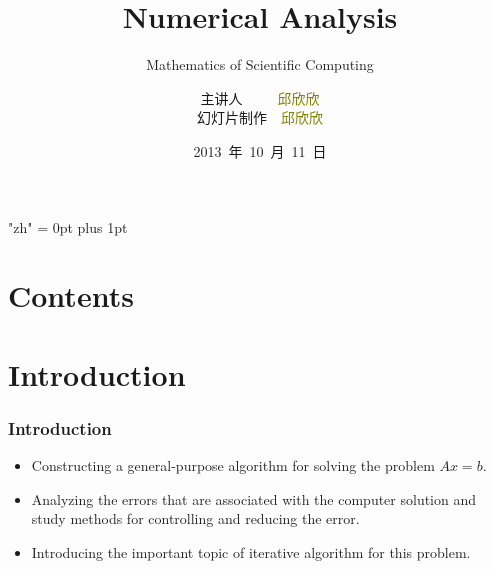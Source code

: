\documentclass[notheorems,mathserif,table,compress]{beamer}  %
\begin{document}
\XeTeXlinebreaklocale "zh"         %
\XeTeXlinebreakskip = 0pt plus 1pt %


\title[Numerical Analysis]{Numerical Analysis}
\subtitle{Mathematics of Scientific Computing}
\author[qiu]{主讲人~~~~~\textcolor{olive}{邱欣欣}\\
    \quad 幻灯片制作~~\textcolor{olive}{邱欣欣}}
\institute[中国海洋大学]{\small\textcolor{violet}{中国海洋大学~~信息科学与工程学院}}
\date{2013~年~10~月~11~日}
\frame{ \titlepage }
\section*{Contents}
\section{Introduction}

\begin{frame}
\frametitle{Introduction}
\begin{itemize}
\item Constructing a general-purpose algorithm for solving the problem $Ax=b$.
\item Analyzing the errors that are associated with the computer solution and study methods for controlling and reducing the error.
\item Introducing the important topic of iterative algorithm for this problem.
\end{itemize}
\end{frame}
\end{document}
